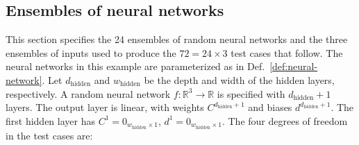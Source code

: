 \documentclass{article}
\begin{document}
\subsection*{Ensembles of neural networks}
This section specifies the 24 ensembles of random neural networks and the three ensembles of inputs used to produce the \(72 = 24 \times 3\) test cases that follow.
The neural networks in this example are parameterized as in Def.~\ref{def:neural-network}.
Let \(d_\mathrm{hidden}\) and \(w_\mathrm{hidden}\) be the depth and width of the hidden layers, respectively.
A random neural network \(f:\mathbb{R}^3 \to \mathbb{R}\) is specified with \(d_\mathrm{hidden} + 1\) layers.
The output layer is linear, with weights \(C^{d_\mathrm{hidden}+1}\) and biases \(d^{d_\mathrm{hidden}+1}\).
The first hidden layer has \(C^1 = 0_{w_\mathrm{hidden} \times 1}\), \(d^1 = 0_{w_\mathrm{hidden} \times 1}\).
The four degrees of freedom in the test cases are:
\end{document}
